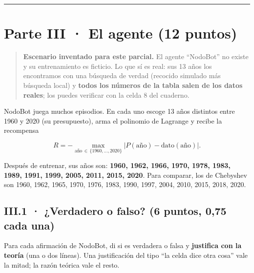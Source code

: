 \begin{center}\rule{0.5\linewidth}{0.5pt}\end{center}

\section{Parte III · El agente (12 puntos)}

\begin{quote}
\textbf{Escenario inventado para este parcial.} El agente ``NodoBot'' no existe y su entrenamiento es ficticio. Lo que sí es real: sus 13 años los encontramos con una búsqueda de verdad (recocido simulado más búsqueda local) y \textbf{todos los números de la tabla salen de los datos reales}; los puedes verificar con la celda 8 del cuaderno.
\end{quote}

NodoBot juega muchos episodios. En cada uno escoge 13 años distintos entre 1960 y 2020 (su presupuesto), arma el polinomio de Lagrange y recibe la recompensa

\[R = -\max_{\text{año}\,\in\,\{1960,\dots,2020\}} \bigl|P(\text{año}) - \text{dato}(\text{año})\bigr| .\]

Después de entrenar, sus años son: \textbf{1960, 1962, 1966, 1970, 1978, 1983, 1989, 1991, 1999, 2005, 2011, 2015, 2020}. Para comparar, los de Chebyshev son 1960, 1962, 1965, 1970, 1976, 1983, 1990, 1997, 2004, 2010, 2015, 2018, 2020.

\subsection{III.1 · ¿Verdadero o falso? (6 puntos, 0,75 cada una)}

Para cada afirmación de NodoBot, di si es verdadera o falsa y \textbf{justifica con la teoría} (una o dos líneas). Una justificación del tipo ``la celda dice otra cosa'' vale la mitad; la razón teórica vale el resto.

